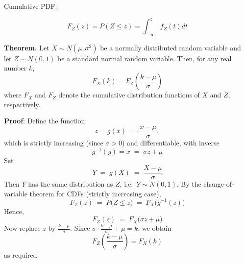 \documentclass[twoside]{book}
\begin{document}
Cumulative PDF:
\begin{textbox}
$$F_Z(z) = P(Z \leq z) = \int_{-\infty}^z f_Z(t)dt$$
\end{textbox}

\vspace{2mm}

\begin{center}
\end{center}

\begin{textbox}
\textbf{Theorem.} Let \( X \sim N(\mu, \sigma^2) \) be a normally distributed random variable and let \( Z \sim N(0, 1) \) be a standard normal random variable. Then, for any real number \( k \),
\[
F_X(k) = F_Z\left( \frac{k - \mu}{\sigma} \right)
\]
where \( F_X \) and \( F_Z \) denote the cumulative distribution functions of \( X \) and \( Z \), respectively.
\end{textbox}

\textbf{Proof}: Define the function
\[
z = g(x) \;=\; \frac{x - \mu}{\sigma},
\]
which is strictly increasing (since \(\sigma>0\)) and differentiable, with inverse
\[
g^{-1}(y) = x \;=\; \sigma z + \mu
\]
Set
\[
Y \;=\; g(X) \;=\; \frac{X - \mu}{\sigma}
\]
Then \(Y\) has the same distribution as \(Z\), i.e.\ \(Y\sim N(0,1)\).  By the change‐of‐variable theorem for CDFs (strictly increasing case),
\[
F_Z(z)
\;=\;
P\bigl(Z \le z\bigr)
\;=\;
F_X\!\bigl(g^{-1}(z)\bigr)
\]
Hence,
\[
F_Z(z)
\;=\;
F_X\!\bigl(\sigma z + \mu\bigr)
\]
Now replace \(z\) by \(\tfrac{k-\mu}{\sigma}\).  Since
\(\sigma\cdot\tfrac{k-\mu}{\sigma} + \mu = k\), we obtain
\[
F_Z\!\left( \dfrac{k - \mu}{\sigma}\right)  = F_X(k)
\]
as required.
\end{document}
